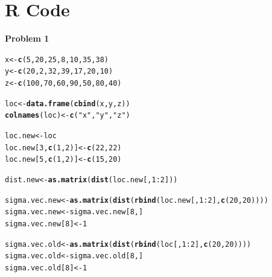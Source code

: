 \documentclass{article}\usepackage[]{graphicx}\usepackage[]{color}
\makeatletter
\newcommand{\hlnum}[1]{\textcolor[rgb]{0.686,0.059,0.569}{#1}}%
\newcommand{\hlstr}[1]{\textcolor[rgb]{0.192,0.494,0.8}{#1}}%
\newcommand{\hlopt}[1]{\textcolor[rgb]{0,0,0}{#1}}%
\newcommand{\hlstd}[1]{\textcolor[rgb]{0.345,0.345,0.345}{#1}}%
\newcommand{\hlkwb}[1]{\textcolor[rgb]{0.69,0.353,0.396}{#1}}%
\newcommand{\hlkwd}[1]{\textcolor[rgb]{0.737,0.353,0.396}{\textbf{#1}}}%
\newenvironment{kframe}{%
 \def\at@end@of@kframe{}%
 \ifinner\ifhmode%
  \def\at@end@of@kframe{\end{minipage}}%
  \begin{minipage}{\columnwidth}%
 \fi\fi%
 \def\FrameCommand##1{\hskip\@totalleftmargin \hskip-\fboxsep
 \colorbox{shadecolor}{##1}\hskip-\fboxsep
     \hskip-\linewidth \hskip-\@totalleftmargin \hskip\columnwidth}%
 \MakeFramed {\advance\hsize-\width
   \@totalleftmargin\z@ \linewidth\hsize
   \@setminipage}}%
 {\par\unskip\endMakeFramed%
 \at@end@of@kframe}
\newenvironment{knitrout}{}{} %
\makeatother
\begin{document}
\section*{R Code}

{\bf Problem 1}

\begin{knitrout}\footnotesize
{}\color{fgcolor}\begin{kframe}
\begin{alltt}
\hlstd{x} \hlkwb{<-} \hlkwd{c}\hlstd{(}\hlnum{5}\hlstd{,}\hlnum{20}\hlstd{,}\hlnum{25}\hlstd{,}\hlnum{8}\hlstd{,}\hlnum{10}\hlstd{,}\hlnum{35}\hlstd{,}\hlnum{38}\hlstd{)}
\hlstd{y} \hlkwb{<-} \hlkwd{c}\hlstd{(}\hlnum{20}\hlstd{,}\hlnum{2}\hlstd{,}\hlnum{32}\hlstd{,}\hlnum{39}\hlstd{,}\hlnum{17}\hlstd{,}\hlnum{20}\hlstd{,}\hlnum{10}\hlstd{)}
\hlstd{z} \hlkwb{<-} \hlkwd{c}\hlstd{(}\hlnum{100}\hlstd{,}\hlnum{70}\hlstd{,}\hlnum{60}\hlstd{,}\hlnum{90}\hlstd{,}\hlnum{50}\hlstd{,}\hlnum{80}\hlstd{,}\hlnum{40}\hlstd{)}

\hlstd{loc} \hlkwb{<-} \hlkwd{data.frame}\hlstd{(}\hlkwd{cbind}\hlstd{(x,y,z))}
\hlkwd{colnames}\hlstd{(loc)} \hlkwb{<-} \hlkwd{c}\hlstd{(}\hlstr{"x"}\hlstd{,} \hlstr{"y"}\hlstd{,} \hlstr{"z"}\hlstd{)}

\hlstd{loc.new} \hlkwb{<-} \hlstd{loc}
\hlstd{loc.new[}\hlnum{3}\hlstd{,}\hlkwd{c}\hlstd{(}\hlnum{1}\hlstd{,}\hlnum{2}\hlstd{)]} \hlkwb{<-} \hlkwd{c}\hlstd{(}\hlnum{22}\hlstd{,}\hlnum{22}\hlstd{)}
\hlstd{loc.new[}\hlnum{5}\hlstd{,}\hlkwd{c}\hlstd{(}\hlnum{1}\hlstd{,}\hlnum{2}\hlstd{)]} \hlkwb{<-} \hlkwd{c}\hlstd{(}\hlnum{15}\hlstd{,}\hlnum{20}\hlstd{)}

\hlstd{dist.new} \hlkwb{<-} \hlkwd{as.matrix}\hlstd{(}\hlkwd{dist}\hlstd{(loc.new[,}\hlnum{1}\hlopt{:}\hlnum{2}\hlstd{]))}

\hlstd{sigma.vec.new} \hlkwb{<-} \hlkwd{as.matrix}\hlstd{(}\hlkwd{dist}\hlstd{(}\hlkwd{rbind}\hlstd{(loc.new[,}\hlnum{1}\hlopt{:}\hlnum{2}\hlstd{],}\hlkwd{c}\hlstd{(}\hlnum{20}\hlstd{,}\hlnum{20}\hlstd{))))}
\hlstd{sigma.vec.new} \hlkwb{<-} \hlstd{sigma.vec.new[}\hlnum{8}\hlstd{,]}
\hlstd{sigma.vec.new[}\hlnum{8}\hlstd{]} \hlkwb{<-} \hlnum{1}

\hlstd{sigma.vec.old} \hlkwb{<-} \hlkwd{as.matrix}\hlstd{(}\hlkwd{dist}\hlstd{(}\hlkwd{rbind}\hlstd{(loc[,}\hlnum{1}\hlopt{:}\hlnum{2}\hlstd{],}\hlkwd{c}\hlstd{(}\hlnum{20}\hlstd{,}\hlnum{20}\hlstd{))))}
\hlstd{sigma.vec.old} \hlkwb{<-} \hlstd{sigma.vec.old[}\hlnum{8}\hlstd{,]}
\hlstd{sigma.vec.old[}\hlnum{8}\hlstd{]} \hlkwb{<-} \hlnum{1}
\end{alltt}
\end{kframe}
\end{knitrout}
\end{document}
